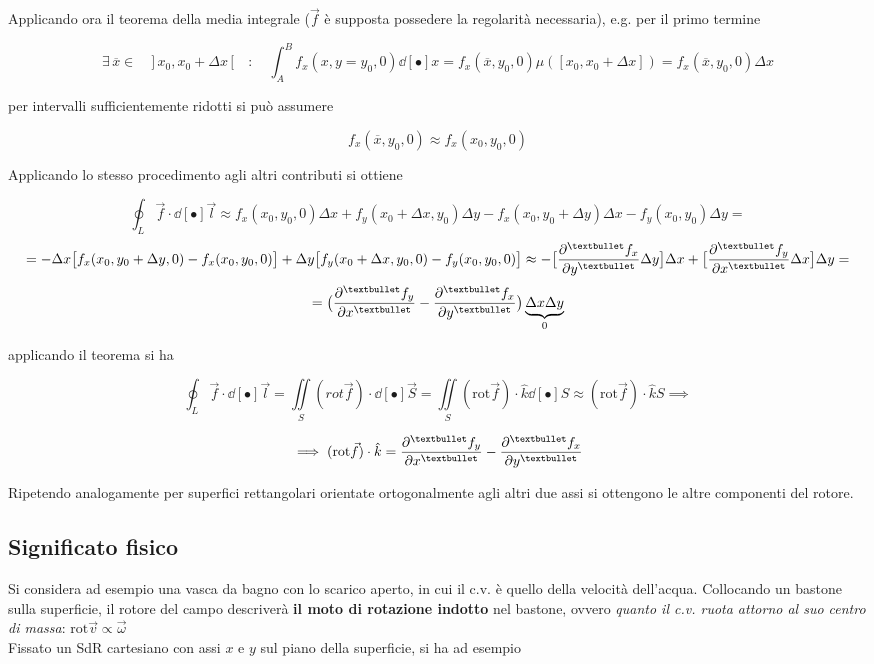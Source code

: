 Applicando ora il teorema della media integrale ($\vec{f}$ è supposta possedere la regolarità necessaria), e.g. per il primo termine

\[\exists \, \overline{x} \in \quad \big] \, x_0, x_0 + \Delta x \, \big[ \quad : \quad \int_A^B f_x(x, y=y_0, 0) \dd[•]{x} = f_x(\overline{x}, y_0, 0) \mu([x_0,x_0 + \Delta x]) = f_x(\overline{x}, y_0, 0) \Delta x\]

per intervalli sufficientemente ridotti si può assumere

\[f_x(\overline{x}, y_0, 0) \approx f_x(x_0, y_0, 0)\]

Applicando lo stesso procedimento agli altri contributi si ottiene

\[\oint_L \vec{f} \cdot \dd[•]{\vec{l}} \approx f_x(x_0, y_0, 0) \Delta x + f_y(x_0 + \Delta x, y_0) \Delta y - f_x(x_0, y_0 + \Delta y) \Delta x - f_y(x_0, y_0) \Delta y = \]
\[ = - \Delta x \big[f_x(x_0,y_0 + \Delta y,0) - f_x(x_0, y_0, 0)\big] + \Delta y \big[f_y(x_0 + \Delta x, y_0, 0) - f_y(x_0, y_0, 0)\big] \approx - \big[\pdv[•]{f_x}{y} \Delta y\big] \Delta x + \big[\pdv[•]{f_y}{x} \Delta x\big] \Delta y = \]
\[= \big(\pdv[•]{f_y}{x} - \pdv[•]{f_x}{y}\big) \underbrace{\Delta x \Delta y}_{0}\]

applicando il teorema si ha

\[\oint_L \vec{f} \cdot \dd[•]{\vec{l}} = \iint\limits_{S} (rot \vec{f}) \cdot \dd[•]{\vec{S}} = \iint\limits_{S} (\mathrm{rot} \vec{f}) \cdot \hat{k}\dd[•]{S} \approx (\mathrm{rot} \vec{f}) \cdot \hat{k} S \implies\]

\[\implies (\mathrm{rot} \vec{f}) \cdot \hat{k} = \pdv[•]{f_y}{x} - \pdv[•]{f_x}{y}\]

Ripetendo analogamente per superfici rettangolari orientate ortogonalmente agli altri due assi si ottengono le altre componenti del rotore.

\subsection{Significato fisico}

Si considera ad esempio una vasca da bagno con lo scarico aperto, in cui il c.v. è quello della velocità dell'acqua. Collocando un bastone sulla superficie, il rotore del campo descriverà \textbf{il moto di rotazione indotto} nel bastone, ovvero \textit{quanto il c.v. ruota attorno al suo centro di massa}: $\mathrm{rot} \vec{v} \propto \vec{\omega}$
\\Fissato un SdR cartesiano con assi $x$ e $y$ sul piano della superficie, si ha ad esempio

